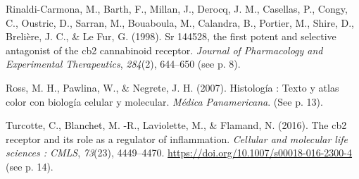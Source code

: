 \documentclass[empirical, authordate, issue]{jote-new-article}
\begin{document}
Rinaldi-Carmona, M., Barth, F., Millan, J., Derocq, J. M., Casellas, P., Congy, C., Oustric, D., Sarran, M., Bouaboula, M., Calandra, B., Portier, M., Shire, D., Brelière, J. C., \& Le Fur, G. (1998). Sr 144528, the first potent and selective antagonist of the cb2 cannabinoid receptor. \emph{Journal of Pharmacology and Experimental Therapeutics}, \emph{284}(2), 644–650 (see p. 8).

Ross, M. H., Pawlina, W., \& Negrete, J. H. (2007). Histología : Texto y atlas color con biología celular y molecular. \emph{Médica Panamericana}. (See p. 13).

Turcotte, C., Blanchet, M. -R., Laviolette, M., \& Flamand, N. (2016). The cb2 receptor and its role as a regulator of inflammation. \emph{Cellular and molecular life sciences : CMLS}, \emph{73}(23), 4449–4470. \url{https://doi.org/10.1007/s00018-016-2300-4} (see p. 14).
\end{document}
